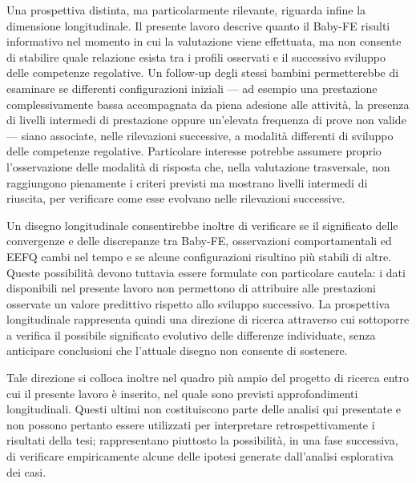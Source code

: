 Una prospettiva distinta, ma particolarmente rilevante, riguarda infine la dimensione longitudinale. Il presente lavoro descrive quanto il Baby-FE risulti informativo nel momento in cui la valutazione viene effettuata, ma non consente di stabilire quale relazione esista tra i profili osservati e il successivo sviluppo delle competenze regolative. Un follow-up degli stessi bambini permetterebbe di esaminare se differenti configurazioni iniziali --- ad esempio una prestazione complessivamente bassa accompagnata da piena adesione alle attività, la presenza di livelli intermedi di prestazione oppure un'elevata frequenza di prove non valide --- siano associate, nelle rilevazioni successive, a modalità differenti di sviluppo delle competenze regolative. Particolare interesse potrebbe assumere proprio l'osservazione delle modalità di risposta che, nella valutazione trasversale, non raggiungono pienamente i criteri previsti ma mostrano livelli intermedi di riuscita, per verificare come esse evolvano nelle rilevazioni successive.

Un disegno longitudinale consentirebbe inoltre di verificare se il significato delle convergenze e delle discrepanze tra Baby-FE, osservazioni comportamentali ed EEFQ cambi nel tempo e se alcune configurazioni risultino più stabili di altre. Queste possibilità devono tuttavia essere formulate con particolare cautela: i dati disponibili nel presente lavoro non permettono di attribuire alle prestazioni osservate un valore predittivo rispetto allo sviluppo successivo. La prospettiva longitudinale rappresenta quindi una direzione di ricerca attraverso cui sottoporre a verifica il possibile significato evolutivo delle differenze individuate, senza anticipare conclusioni che l'attuale disegno non consente di sostenere.

Tale direzione si colloca inoltre nel quadro più ampio del progetto di ricerca entro cui il presente lavoro è inserito, nel quale sono previsti approfondimenti longitudinali. Questi ultimi non costituiscono parte delle analisi qui presentate e non possono pertanto essere utilizzati per interpretare retrospettivamente i risultati della tesi; rappresentano piuttosto la possibilità, in una fase successiva, di verificare empiricamente alcune delle ipotesi generate dall'analisi esplorativa dei casi.

